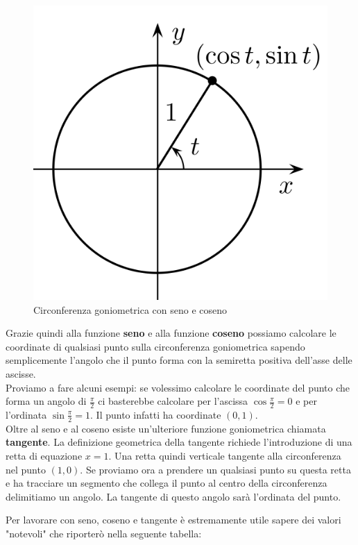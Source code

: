 \begin{figure}[H]
    \centering
    \includegraphics[width=0.3\linewidth]{../img/unitCircle1.png}
    \caption{Circonferenza goniometrica con seno e coseno}
\end{figure}

Grazie quindi alla funzione \textbf{seno} e alla funzione \textbf{coseno} possiamo calcolare le coordinate di qualsiasi punto sulla circonferenza goniometrica sapendo semplicemente l'angolo che il punto forma con la semiretta positiva dell'asse delle ascisse.\\

Proviamo a fare alcuni esempi: se volessimo calcolare le coordinate del punto che forma un angolo di $\frac{\pi}{2}$ ci basterebbe calcolare per l'ascissa $\cos{\frac{\pi}{2}} = 0$ e per l'ordinata $\sin{\frac{\pi}{2}} = 1$. Il punto infatti ha coordinate $(0, 1)$.\\

Oltre al seno e al coseno esiste un'ulteriore funzione goniometrica chiamata \textbf{tangente}. La definizione geometrica della tangente richiede l'introduzione di una retta di equazione $x = 1$. Una retta quindi verticale tangente alla circonferenza nel punto $(1, 0)$. Se proviamo ora a prendere un qualsiasi punto su questa retta e ha tracciare un segmento che collega il punto al centro della circonferenza delimitiamo un angolo. La tangente di questo angolo sarà l'ordinata del punto. %


Per lavorare con seno, coseno e tangente è estremamente utile sapere dei valori "notevoli" che riporterò nella seguente tabella:

